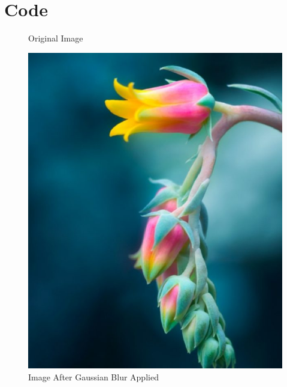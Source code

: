 \documentclass[11pt]{article}
\begin{document}
    \section{Code}\label{sec:codeExplanation}
    

    \begin{figure}[h]
        \flushleft
        \caption{Original Image}
        \centering
        \includegraphics[scale=0.4]{Exercise1_Image.jpg}
        \caption{Image After Gaussian Blur Applied}

\end{figure}
\end{document}
